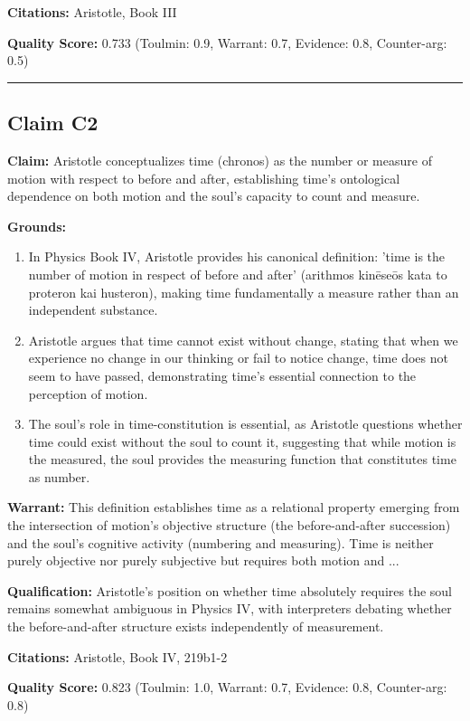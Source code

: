 \documentclass[12pt,a4paper]{article}
\begin{document}
\textbf{Citations:} Aristotle, Book III

\textbf{Quality Score:} 0.733 (Toulmin: 0.9, Warrant: 0.7, Evidence: 0.8, Counter-arg: 0.5)

\medskip\hrule\medskip

\subsection*{Claim C2}

\textbf{Claim:} Aristotle conceptualizes time (chronos) as the number or measure of motion with respect to before and after, establishing time's ontological dependence on both motion and the soul's capacity to count and measure.

\textbf{Grounds:}
\begin{enumerate}[nosep]
\item In Physics Book IV, Aristotle provides his canonical definition: 'time is the number of motion in respect of before and after' (arithmos kinēseōs kata to proteron kai husteron), making time fundamentally a measure rather than an independent substance.
\item Aristotle argues that time cannot exist without change, stating that when we experience no change in our thinking or fail to notice change, time does not seem to have passed, demonstrating time's essential connection to the perception of motion.
\item The soul's role in time-constitution is essential, as Aristotle questions whether time could exist without the soul to count it, suggesting that while motion is the measured, the soul provides the measuring function that constitutes time as number.
\end{enumerate}

\textbf{Warrant:} This definition establishes time as a relational property emerging from the intersection of motion's objective structure (the before-and-after succession) and the soul's cognitive activity (numbering and measuring). Time is neither purely objective nor purely subjective but requires both motion and ...

\textbf{Qualification:} Aristotle's position on whether time absolutely requires the soul remains somewhat ambiguous in Physics IV, with interpreters debating whether the before-and-after structure exists independently of measurement.

\textbf{Citations:} Aristotle, Book IV, 219b1-2

\textbf{Quality Score:} 0.823 (Toulmin: 1.0, Warrant: 0.7, Evidence: 0.8, Counter-arg: 0.8)
\end{document}

